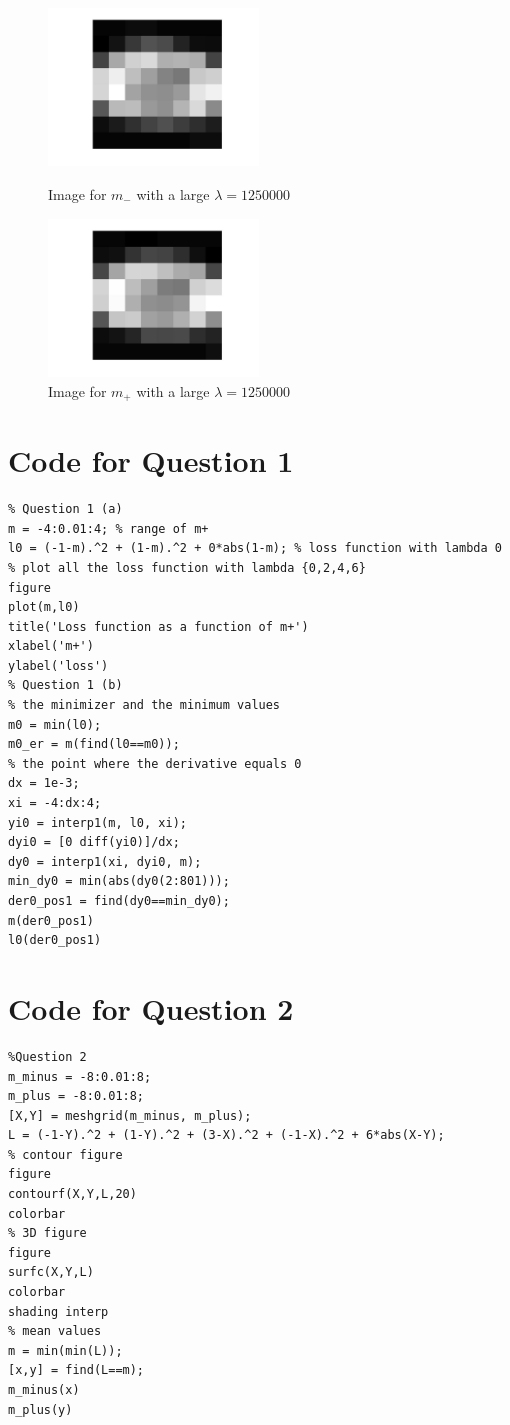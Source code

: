 \documentclass[a4paper]{scrartcl}
\begin{document}
\begin{figure}[!ht]
\begin{minipage}[t]{0.5\linewidth}
\centering
\includegraphics[width=2.2in]{q3c.jpg}
\caption{Image for $m_-$ with a large $\lambda = 1250000 $}
\label{fig:q3c}
\end{minipage}%
\begin{minipage}[t]{0.5\linewidth}
\centering
\includegraphics[width=2.2in]{q3d.jpg}
\caption{Image for $m_+$ with a large $\lambda =1250000$}
\label{fig:q3d}
\end{minipage}
\end{figure}

\clearpage
\appendix
\section{Code for Question 1}
\label{app: a}
\begin{lstlisting}
% Question 1 (a)
m = -4:0.01:4; % range of m+
l0 = (-1-m).^2 + (1-m).^2 + 0*abs(1-m); % loss function with lambda 0
% plot all the loss function with lambda {0,2,4,6}
figure
plot(m,l0)
title('Loss function as a function of m+')
xlabel('m+')
ylabel('loss')
% Question 1 (b)
% the minimizer and the minimum values
m0 = min(l0);
m0_er = m(find(l0==m0));
% the point where the derivative equals 0
dx = 1e-3;
xi = -4:dx:4;
yi0 = interp1(m, l0, xi);
dyi0 = [0 diff(yi0)]/dx;
dy0 = interp1(xi, dyi0, m);
min_dy0 = min(abs(dy0(2:801)));
der0_pos1 = find(dy0==min_dy0);
m(der0_pos1)
l0(der0_pos1)
\end{lstlisting}

\section{Code for Question 2}
\label{app:b}
\begin{lstlisting}
%Question 2
m_minus = -8:0.01:8;
m_plus = -8:0.01:8;
[X,Y] = meshgrid(m_minus, m_plus);
L = (-1-Y).^2 + (1-Y).^2 + (3-X).^2 + (-1-X).^2 + 6*abs(X-Y);
% contour figure
figure
contourf(X,Y,L,20)
colorbar
% 3D figure
figure
surfc(X,Y,L)
colorbar
shading interp
% mean values
m = min(min(L));
[x,y] = find(L==m);
m_minus(x)
m_plus(y)
\end{lstlisting}
\end{document}
